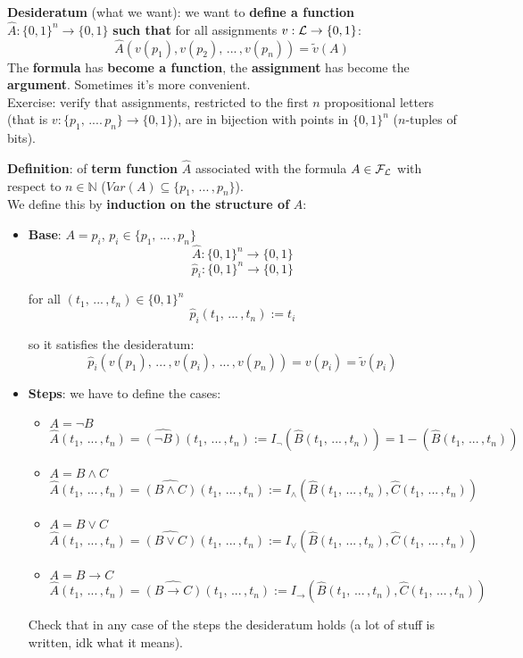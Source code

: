 	\textbf{Desideratum} (what we want): we want to \textbf{define a function} $\hat{A}: \{0,1\}^n \rightarrow \{0,1\}$ \textbf{such that} for all assignments $v: \mathcal{L} \rightarrow \{0,1\}$:
	$$ \hat{A} (v(p_1), v(p_2), \, ... \, , v(p_n)) = \tilde{v} (A) $$
	The \textbf{formula} has \textbf{become a function}, the \textbf{assignment} has become the \textbf{argument}. Sometimes it's more convenient.\\

	Exercise: verify that assignments, restricted to the first $n$ propositional letters (that is $v: \{p_1, \, .... \, p_n\} \rightarrow \{0,1\}$), are in bijection with points in $\{0,1\}^n$ ($n$-tuples of bits).\\

	\newpage

	\textbf{Definition}: of \textbf{term function} $\hat{A}$ associated with the formula $A \in \mathcal{F}_\mathcal{L}$ with respect to $n \in \mathbb{N}$ ($Var(A) \subseteq \{p_1, \, ... \, , p_n\}$).\\

	We define this by \textbf{induction on the structure of} $A$:
	\begin{itemize}
		\item \textbf{Base}: $A = p_i$, $p_i \in \{p_1, \, ... \, , p_n\}$
		$$ \hat{A}: \{0,1\}^n \rightarrow \{0,1\}$$
		$$ \hat{p}_i: \{0,1\}^n \rightarrow \{0,1\}$$

		for all $(t_1, \, ... \, , t_n) \in \{0,1\}^n$
		$$ \hat{p}_i (t_1, \, ... \, , t_n) :=  t_i $$

		so it satisfies the desideratum:
		$$ \hat{p}_i (v(p_1), \, ... \, , v(p_i), \, ... \, , v(p_n)) = v(p_i) = \tilde{v} (p_i) $$

		\item \textbf{Steps}: we have to define the cases:
		\begin{itemize}
			\item $A = \neg B$
			$$ \hat{A} (t_1, \, ... \, , t_n) = \hat{(\neg B)} (t_1, \, ... \, , t_n) := I_\neg (\hat B (t_1, \, ... \, , t_n)) =  1 - (\hat B (t_1, \, ... \, , t_n))$$

			\item $A = B \wedge C$
			$$ \hat{A} (t_1, \, ... \, , t_n) =  \hat{(B \wedge C)} (t_1, \, ... \, , t_n) := I_\wedge (\hat B (t_1, \, ... \, , t_n), \hat C (t_1, \, ... \, , t_n))$$

			\item $A = B \vee C$
			$$ \hat{A} (t_1, \, ... \, , t_n) =  \hat{(B \vee C)} (t_1, \, ... \, , t_n) := I_\vee (\hat B (t_1, \, ... \, , t_n), \hat C (t_1, \, ... \, , t_n))$$

			\item $A = B \rightarrow C$
			$$ \hat{A} (t_1, \, ... \, , t_n) =  \hat{(B \rightarrow C)} (t_1, \, ... \, , t_n) := I_\rightarrow (\hat B (t_1, \, ... \, , t_n), \hat C (t_1, \, ... \, , t_n))$$
		\end{itemize}

		Check that in any case of the steps the desideratum holds (a lot of stuff is written, idk what it means).
	\end{itemize}

